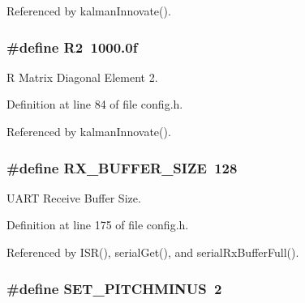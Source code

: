 Referenced by kalman\-Innovate().

\hypertarget{group__config_ga7a255a2815b9453060f51c6eb22cfed8}{
\subsubsection[{R2}]{\setlength{\rightskip}{0pt plus 5cm}\#define R2~1000.\-0f}}\label{group__config_ga7a255a2815b9453060f51c6eb22cfed8}


R Matrix Diagonal Element 2. 



Definition at line 84 of file config.\-h.



Referenced by kalman\-Innovate().

\hypertarget{group__config_ga739a2a1a0047c98ac1b18ecd25dac092}{
\subsubsection[{R\-X\-\_\-\-B\-U\-F\-F\-E\-R\-\_\-\-S\-I\-Z\-E}]{\setlength{\rightskip}{0pt plus 5cm}\#define R\-X\-\_\-\-B\-U\-F\-F\-E\-R\-\_\-\-S\-I\-Z\-E~128}}\label{group__config_ga739a2a1a0047c98ac1b18ecd25dac092}


U\-A\-R\-T Receive Buffer Size. 



Definition at line 175 of file config.\-h.



Referenced by I\-S\-R(), serial\-Get(), and serial\-Rx\-Buffer\-Full().

\hypertarget{group__config_ga8c969dbb07dc504226fc2c69484b9768}{
\subsubsection[{S\-E\-T\-\_\-\-P\-I\-T\-C\-H\-M\-I\-N\-U\-S}]{\setlength{\rightskip}{0pt plus 5cm}\#define S\-E\-T\-\_\-\-P\-I\-T\-C\-H\-M\-I\-N\-U\-S~2}}\label{group__config_ga8c969dbb07dc504226fc2c69484b9768}


